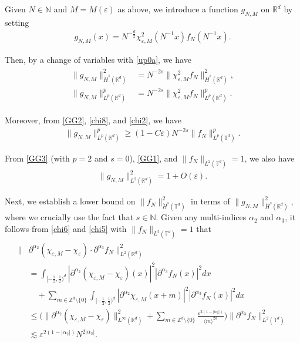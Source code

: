 \documentclass[letterpaper, 11pt,  reqno]{amsart}
\newcommand{\noi}{\noindent}
\newcommand{\Z}{\mathbb{Z}}
\newcommand{\R}{\mathbb{R}}
\newcommand{\T}{\mathbb{T}}
\newcommand{\al}{\alpha}
\newcommand{\eps}{\varepsilon}
\newcommand{\dd}{\partial}
\newcommand{\les}{\lesssim}
\newcommand{\jb}[1]
{\langle #1 \rangle}
\newcommand{\N}{\mathbb{N}}
\numberwithin{equation}{section}
\numberwithin{theorem}{section}
\begin{document}
Given $N \in \N$ and $M =  M(\eps)$ as above, 
 we introduce a function $g_{N,M}$ on $\R^d$ by setting
\begin{align}
g_{N,M} (x) = N^{- \frac d2} \chi_{\eps,M}^2 (N^{-1}x) f_N (N^{-1} x).
\label{GG1}
\end{align}

\noi
Then, by a change of variables with \eqref{up0a}, we have
\begin{align}
\begin{split}
\|g_{N,M}\|^2_{\dot H^s(\R^d)}
&=N^{-2s}\| \chi^2_{\eps,M} f_N\|^2_{\dot H^s(\R^d)},\\
\|g_{N,M}\|^{p}_{L^{p}(\R^d)}
&=N^{-2s}
\|\chi^2_{\eps,M}f_N\|^p_{L^{p}(\R^d)}.
\end{split}
\label{GG2}
\end{align}


\noi
Moreover, from 
\eqref{GG2}, \eqref{chi8},  
and 
\eqref{chi2}, we have 
\begin{align}
\|g_{N,M}\|^{p}_{L^{p}(\R^d)}
\ge  (1- C\eps) 
N^{-2s}\|f_N\|^p_{L^{p}(\T^d)}.
\label{GG3}
\end{align}

\noi
From \eqref{GG3} (with $p = 2$ and $s = 0$), \eqref{GG1}, and $\|f_N\|_{L^2(\T^d)} = 1$, we also have 
\begin{align}
\|g_{N,M}\|_{L^{2}(\R^d)}^2 = 1+ O(\eps).
\label{GG4}
\end{align}




Next, we establish a lower bound on $\|f_N\|_{\dot H^s(\T^d)}^2$
in terms of  $\|g_{N,M}\|^2_{\dot H^s(\R^d)}$,
where we crucially use the fact that $s \in \N$.
Given any multi-indices $\al_2$ and $\al_3$, 
it follows from 
 \eqref{chi6} and \eqref{chi5} 
 with 
$\| f_N \|_{L^2(\T^d)} = 1$
that 
\begin{align}
\begin{split}
\| &\dd^{\al_2}(\chi_{\eps,M}-\chi_{\eps}) \cdot \partial^{\alpha_3}f_N \|^2_{L^{2}(\R^d)}\\
&=\int_{[-\frac 12,\frac 12)^d}
|\dd^{\al_2}(\chi_{\eps,M}-\chi_{\eps})(x)|^2
| \partial^{\alpha_3}f_N(x)|^2 dx\\
& \quad 
+\sum_{m\in \Z^d\setminus \{0\}}\int_{[-\frac 12,\frac 12)^d}
|\dd^{\al_2}\chi_{\eps,M}(x+m)|^2 
|\partial^{\alpha_3}f_N(x)|^2dx\\
&\le \bigg(\| \dd^{\al_2}(\chi_{\eps,M}-\chi_{\eps})\|^2_{L^{\infty}(\R^d)}
+   \sum_{m\in \Z^d\setminus \{0\}}\frac {\eps^{2(1-|\al_2|)}}{\jb{m}^{2d}}
\bigg)
\|\dd^{\al_3} f_N \|_{L^2(\T^d)}^2\\
& \les \eps^{2(1-|\al_2|)}
N^{2|\al_3|}.
\end{split}
\label{GG6}
\end{align}
\end{document}
